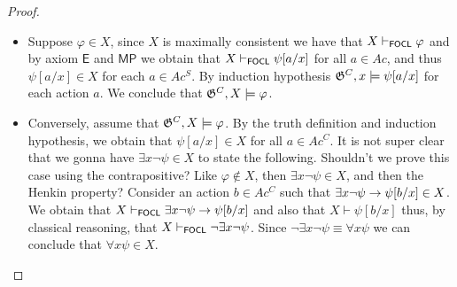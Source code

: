 \documentclass{article}
\newcommand{\rev}[1]{{\color{blue} #1}}
\theoremstyle{definition}
\begin{document}
\begin{proof}
\begin{itemize}
    \begin{itemize}
        \item[] Suppose $\varphi\in X$, since $X$ is maximally consistent we have that $X\vdash_{\mathsf{FOCL}} \varphi$ and by axiom $\mathsf{E}$ and $\mathsf{MP}$ we obtain that $X\vdash_{\mathsf{FOCL}} \psi[a / x]$ for all $a\in Ac$, and thus $\psi[a/x]\in X$ for each $a\in Ac^S$. By induction hypothesis $\mathfrak{G}^C,x \models \psi[a/x]$ for each action $a$. We conclude that $\mathfrak{G}^C, X \models \varphi$. 
        \item[] Conversely, assume that $\mathfrak{G}^C, X \models \varphi$. By the truth definition and induction hypothesis, we obtain that $\psi[a/x]\in X$ for all $a\in Ac^C$. 
        \rev{It is not super clear that we gonna have $\exists x \lnot \psi \in X$ to state the following. Shouldn't we prove this case using the contrapositive? Like $\varphi \not \in X$, then $\exists x \lnot \psi \in X$, and then the Henkin property?}
        Consider an action $b\in Ac^C$ such that $\exists x \neg \psi \to \psi [b/x]\in X$. 
        We obtain that $X\vdash_{\mathsf{FOCL}} \exists x \neg \psi \to \psi [b/x] $  and also that $X \vdash \psi [b/x]$ thus, by classical reasoning, that $X\vdash_{\mathsf{FOCL}} \neg \exists x \neg \psi$. Since $\neg \exists x \neg \psi \equiv \forall x \psi $ we can conclude \rev{that $\forall x \psi \in X$}.   
    \end{itemize}

\end{itemize}\end{proof}
    

    


    


    




\end{document}
